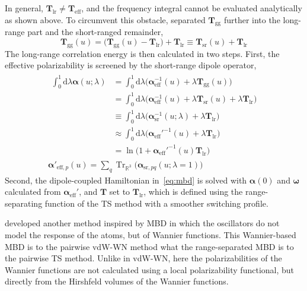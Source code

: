 In general, $\mathbf T_\text{lr}\neq\mathbf T_\text{eff}$, and the frequency integral cannot be evaluated analytically as shown above.
To circumvent this obstacle, \citet{AmbrosettiJCP14} separated $\mathbf T_\text{gg}$ further into the long-range part and the short-ranged remainder,
\begin{equation}
  \mathbf T_\text{gg}(u)=\big(\mathbf T_\text{gg}(u)-\mathbf T_\text{lr}\big)+\mathbf T_\text{lr}\equiv\mathbf T_\text{sr}(u)+\mathbf T_\text{lr}
\end{equation}
The long-range correlation energy is then calculated in two steps.
First, the effective polarizability is screened by the short-range dipole operator,
\begin{gather}
\begin{aligned}
  \textstyle\int_0^1\mathrm d\lambda\boldsymbol\alpha(u;\lambda) 
  &=\textstyle\int_0^1\mathrm d\lambda\big(\boldsymbol\alpha_\text{eff}^{-1}(u)+\lambda\mathbf T_\text{gg}(u)\big) \\
  &=\textstyle\int_0^1\mathrm d\lambda\big(\boldsymbol\alpha_\text{eff}^{-1}(u)+\lambda\mathbf T_\text{sr}(u)+\lambda\mathbf T_\text{lr}\big) \\
  &\equiv\textstyle\int_0^1\mathrm d\lambda\big(\boldsymbol\alpha_\text{sr}^{-1}(u;\lambda)+\lambda\mathbf T_\text{lr}\big) \\
  &\approx\textstyle\int_0^1\mathrm d\lambda\big(\boldsymbol\alpha_\text{eff}'^{-1}(u)+\lambda\mathbf T_\text{lr}\big) \\
  &=\ln\big(1+\boldsymbol\alpha_\text{eff}'^{-1}(u)\mathbf T_\text{lr}\big)
\end{aligned}\label{eq:mbd-dyson} \\
\boldsymbol\alpha'_{\text{eff},p}(u)=\sum_q\operatorname{Tr}_{\mathbb R^3}\big(\boldsymbol\alpha_{\text{sr},pq}(u;\lambda=1)\!\big)
\label{eq:contraction}
\end{gather}
Second, the dipole-coupled Hamiltonian in~\eqref{eq:mbd} is solved with $\boldsymbol\alpha(0)$ and $\boldsymbol\omega$ calculated from $\boldsymbol\alpha_\text{eff}'$, and $\mathbf T$ set to $\mathbf T_\text{lr}$, which is defined using the range-separating function of the TS method with a smoother switching profile.

\citet{SilvestrelliJCP13} developed another method inspired by MBD in which the oscillators do not model the response of the atoms, but of Wannier functions.
This Wannier-based MBD is to the pairwise vdW-WN method what the range-separated MBD is to the pairwise TS method.
Unlike in vdW-WN, here the polarizabilities of the Wannier functions are not calculated using a local polarizability functional, but directly from the Hirshfeld volumes of the Wannier functions.
